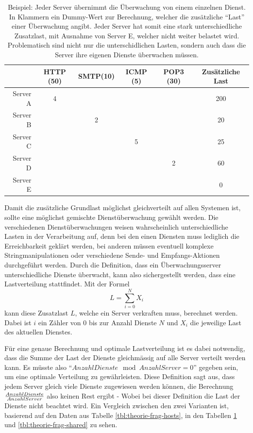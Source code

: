 \begin{table}[ht]
 \centering
 \begin{tabular}{r|c|c|c|c|c}
   & HTTP (50) & SMTP(10) & ICMP (5) & POP3 (30) & Zus\"atzliche Last \\
  \hline
  Server A & 4 &   &   &   & 200 \\
  \hline
  Server B &   & 2 &   &   & 20 \\
  \hline
  Server C &   &   & 5 &   & 25 \\
  \hline
  Server D &   &   &   & 2 & 60 \\
  \hline
  Server E &   &   &   &   & 0
 \end{tabular}
 \caption[Lastenvergleich, wenn gruppiert nach Dienst \"uberwacht wird]{Beispiel: Jeder Server \"ubernimmt die \"Uberwachung von einem einzelnen Dienst. In Klammern ein Dummy-Wert zur Berechnung, welcher die zus\"atzliche "`Last"' einer \"Uberwachung angibt. Jeder Server hat somit eine stark unterschiedliche Zusatzlast, mit Ausnahme von Server E, welcher nicht weiter belastet wird. Problematisch sind nicht nur die unterschidlichen Lasten, sondern auch dass die Server ihre eigenen Dienste \"uberwachen m\"ussen.}
 \label{tbl:theorie-frag-nonshared}
\end{table}

Damit die zus\"atzliche Grundlast m\"oglichst gleichverteilt auf allen Systemen ist, sollte eine m\"oglichst gemischte Dienst\"uberwachung gew\"ahlt werden. Die verschiedenen Dienst\"uberwachungen weisen wahrscheinlich unterschiedliche Lasten in der Verarbeitung auf, denn bei den einen Diensten muss lediglich die Erreichbarkeit gekl\"art werden, bei anderen m\"ussen eventuell komplexe Stringmanipulationen oder verschiedene Sende- und Empfangs-Aktionen durchgef\"uhrt werden. Durch die Definition, dass ein \"Uberwachungsserver unterschiedliche Dienste \"uberwacht, kann also sichergestellt werden, dass eine Lastverteilung stattfindet. Mit der Formel
\begin{equation}
 L = \sum_{i=0}^{N} {X_i}
\label{eq:theorie-frag-shared}
\end{equation}
kann diese Zusatzlast $L$, welche ein Server verkraften muss, berechnet werden. Dabei ist $i$ ein Z\"ahler von $0$ bis zur Anzahl Dienste $N$ und $X_i$ die jeweilige Last des aktuellen Dienstes.

F\"ur eine genaue Berechnung und optimale Lastverteilung ist es dabei notwendig, dass die Summe der Last der Dienste gleichm\"assig auf alle Server verteilt werden kann. Es m\"usste also "`$AnzahlDienste \mod AnzahlServer = 0$"' gegeben sein, um eine optimale Verteilung zu gew\"ahrleisten. Diese Definition sagt aus, dass jedem Server gleich viele Dienste zugewiesen werden k\"onnen, die Berechnung $AnzahlDienste \over AnzahlServer$ also keinen Rest ergibt - Wobei bei dieser Definition die Last der Dienste nicht beachtet wird. Ein Vergleich zwischen den zwei Varianten ist, basierend auf den Daten aus Tabelle \ref{tbl:theorie-frag-hosts}, in den Tabellen \ref{tbl:theorie-frag-nonshared} und \ref{tbl:theorie-frag-shared} zu sehen.

